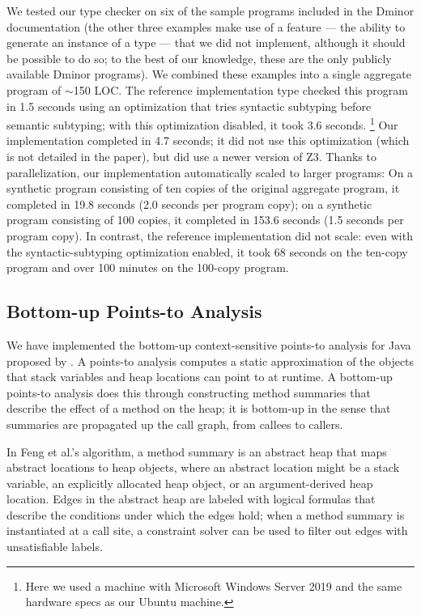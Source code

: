 \documentclass[acmsmall,screen,nonacm]{acmart}
\theoremstyle{definition}
\begin{document}
We tested our type checker on six of the sample programs included in the Dminor
documentation (the other three examples make use of a feature --- the ability
to generate an instance of a type --- that we did not implement, although it
should be possible to do so; to the best of our knowledge, these are the only
publicly available Dminor programs).
We combined these examples into a single aggregate program of $\sim$150 LOC.
The reference implementation type checked this program in 1.5 seconds using an
optimization that tries syntactic subtyping before semantic subtyping; with
this optimization disabled, it took 3.6 seconds.%
\footnote{Here we used a machine with Microsoft Windows Server 2019 and the
same hardware specs as our Ubuntu machine.}
Our implementation completed in 4.7 seconds; it did not use this optimization
(which is not detailed in the paper), but did use a newer version of Z3.
Thanks to parallelization, our implementation automatically scaled to larger
programs: On a synthetic program consisting of ten copies of the original
aggregate program, it completed in 19.8 seconds (2.0 seconds per program copy);
on a synthetic program consisting of 100 copies, it completed in 153.6 seconds
(1.5 seconds per program copy).
In contrast, the reference implementation did not scale: even with the
syntactic-subtyping optimization enabled, it took 68 seconds on the ten-copy
program and over 100 minutes on the 100-copy program.

\subsection{Bottom-up Points-to Analysis}
\label{sec:pointsto}

We have implemented the bottom-up context-sensitive points-to analysis for Java
proposed by \citet{bottomupPointsto}.
A points-to analysis computes a static approximation of the objects that stack
variables and heap locations can point to at runtime.
A bottom-up points-to analysis does this through constructing method summaries
that describe the effect of a method on the heap; it is bottom-up in the sense
that summaries are propagated up the call graph, from callees to callers.

In Feng et al.'s algorithm, a method summary is an abstract heap that maps
abstract locations to heap objects, where an abstract location might be a stack
variable, an explicitly allocated heap object, or an argument-derived heap
location.
Edges in the abstract heap are labeled with logical formulas that describe
the conditions under which the edges hold;
when a method summary is instantiated at a call site, a constraint solver can
be used to filter out edges with unsatisfiable labels.
\end{document}
